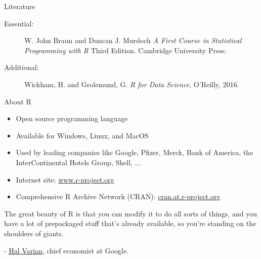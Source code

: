 \documentclass[aspectratio=169]{beamer}
\begin{document}
\begin{frame}{Literature}
\begin{description}
    \item[Essential:] W. John Braun and Duncan J. Murdoch%
    \newline
    \emph{A First Course in Statistical Programming with R}\newline
    Third Edition. Cambridge University Press.\medskip
    \item[Additional:] Wickham, H. and Grolemund, G.\newline
    \emph{R for Data Science}, O'Reilly, 2016.
\end{description}
\end{frame}

\begin{frame}{About R}
\begin{itemize}
    \item Open source programming language
    \item Available for Windows, Linux, and MacOS
    \item Used by leading companies like Google, Pfizer, Merck, Bank of America, the
InterContinental Hotels Group, Shell, ... 
    \item Internet site: \url{www.r-project.org}
    \item Comprehensive R Archive Network (CRAN): \url{cran.at.r-project.org}
\end{itemize}
\vspace{0.2cm}

    \begin{center}
        \begin{tcolorbox}[enhanced,sharp corners,
            width=14.8cm,
            colback=white,
            overlay={
                \node[anchor=north west,fill=white,draw=white,circle,inner sep=1pt] 
                at ([xshift=-0.17cm,yshift=0.2cm]frame.north west) {\faQuoteLeft};
                \node[anchor=south east,fill=white,draw=white,circle,inner sep=1pt] 
                at ([xshift=0.17cm,yshift=-0.2cm]frame.south east) {\faQuoteRight};
            }
            ]
            The great beauty of R is that you can modify it to do all sorts of things, and you have a lot of prepackaged stuff that's already available, so you're standing on the shoulders of giants. \\
            \vspace{0cm}

            {\small - \href{https://www.nytimes.com/2009/01/07/technology/business-computing/07program.html}{Hal Varian}, chief economist at
Google.}
        \end{tcolorbox}
    \end{center}
\end{frame}
\end{document}
